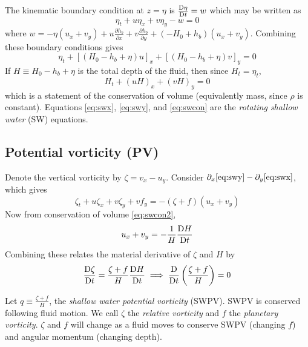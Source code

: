 \documentclass{jknotes}
\begin{document}
The kinematic boundary condition at $z = \eta$ is $\frac{\mathrm{D} \eta}{\mathrm{D}
t} = w$ which may be written as
\begin{equation}
	\eta_t + u \eta_x + v \eta_y - w = 0
\end{equation}
where $w = -\eta(u_x+v_y) + u \frac{\partial h_b}{\partial x} + v
\frac{\partial h_b}{\partial y} + (-H_0 + h_b)(u_x+v_y)$. Combining these
boundary conditions gives
\begin{equation}
	\eta_t + \left[ (H_0-h_b+\eta)u\right]_x + \left[ (H_0-h_b+\eta)v\right]_y
	= 0 \label{eq:swcon}
\end{equation}
If $H \equiv H_0 - h_b + \eta$ is the total depth of the fluid, then since
$H_t = \eta_t$,
\begin{equation}
	H_t + (uH)_x + (vH)_y = 0 \label{eq:swcon2}
\end{equation}
which is a statement of the conservation of volume (equivalently mass, since
$\rho$ is constant). Equations \eqref{eq:swx}, \eqref{eq:swy}, and
\eqref{eq:swcon} are the \emph{rotating shallow water} (SW) equations.

\subsection{Potential vorticity (PV)}
Denote the vertical vorticity by $\zeta = v_x - u_y$. Consider $\partial_x
\eqref{eq:swy} - \partial_y \eqref{eq:swx}$, which gives
\begin{equation}
	\zeta_t +u\zeta_x + v\zeta_y + v f_y = -(\zeta + f)(u_x+v_y)
\end{equation}
Now from conservation of volume \eqref{eq:swcon2},
\begin{equation} 
	u_x + v_y = -\frac{1}{H} \frac{\mathrm{D} H}{\mathrm{D} t}
\end{equation}
Combining these relates the material derivative of $\zeta$ and $H$ by
\begin{equation}
	\frac{\mathrm{D} \zeta}{\mathrm{D} t} = \frac{\zeta + f}{H} \frac{\mathrm{D} H}{\mathrm{D}
	t} \implies \frac{\mathrm{D}}{\mathrm{D} t}\left(\frac{\zeta + f}{H}\right) = 0
	\label{eq:PV}
\end{equation}

Let $q \equiv \frac{\zeta + f}{H}$, the \emph{shallow water potential
vorticity} (SWPV). SWPV is conserved following fluid motion. We call $\zeta$
the \emph{relative vorticity} and $f$ the \emph{planetary vorticity}. $\zeta$
and $f$ will change as a fluid moves to conserve SWPV (changing $f$) and
angular momentum (changing depth).
\end{document}
